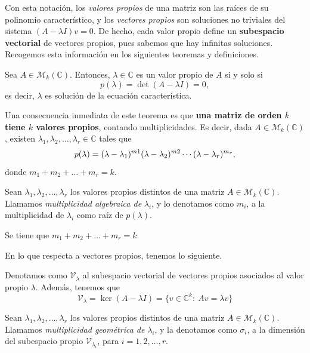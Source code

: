 Con esta notación, los \textit{valores propios} de una matriz son las raíces de su polinomio característico, y los \textit{vectores propios} son soluciones no triviales del sistema $(A - \lambda I)v = 0$. De hecho, cada valor propio define un \textbf{subespacio vectorial} de vectores propios, pues sabemos que hay infinitas soluciones. Recogemos esta información en los siguientes teoremas y definiciones.


\begin{nth} Sea $A \in \mathcal M_k(\mathbb C)$. Entonces, $\lambda \in \mathbb C$ es un valor propio de $A$ si y solo si $$p(\lambda) = \det(A - \lambda I)=0,$$ es decir, $\lambda$ es solución de la ecuación característica.

\end{nth}

Una consecuencia inmediata de este teorema es que \textbf{una matriz de orden $k$ tiene $k$ valores propios}, contando multiplicidades. Es decir, dada $A \in \mathcal M_k(\mathbb C)$, existen $\lambda_1,\lambda_2,\dots,\lambda_r \in \mathbb{C}$ tales que $$p(\lambda) = (\lambda - \lambda_1)^{m1}(\lambda - \lambda_2)^{m2} \cdots (\lambda - \lambda_r)^{m_r},$$ donde $m_1 + m_2 + \dots + m_r = k$.

\begin{ndef} Sean $\lambda_1,\lambda_2,\dots,\lambda_r$ los valores propios distintos de una matriz $A \in \mathcal M_k(\mathbb C)$.
	Llamamos \textit{multiplicidad algebraica de} $\lambda_i$, y lo denotamos como $m_i$, a la multiplicidad de $\lambda_i$ como raíz de $p(\lambda)$.

	Se tiene que $m_1 + m_2 + \dots + m_r = k$.

\end{ndef}

En lo que respecta a vectores propios, tenemos lo siguiente.

\begin{ndef}
	Denotamos como $\mathcal V_\lambda$ al subespacio vectorial de vectores propios asociados al valor propio $\lambda$. Además, tenemos que $$\mathcal V_\lambda = \ker (A - \lambda I) = \{ v \in \mathbb C^k : \  Av = \lambda v\}$$
\end{ndef}

\begin{ndef} Sean $\lambda_1,\lambda_2,\dots,\lambda_r$ los valores propios distintos de una matriz $A \in \mathcal M_k(\mathbb C)$.
	Llamamos \textit{multiplicidad geométrica de} $\lambda_i$, y la denotamos como $\sigma_i$, a la dimensión del subespacio propio $\mathcal V_{\lambda_i}$, para $i=1,2,\dots,r$.
\end{ndef}

